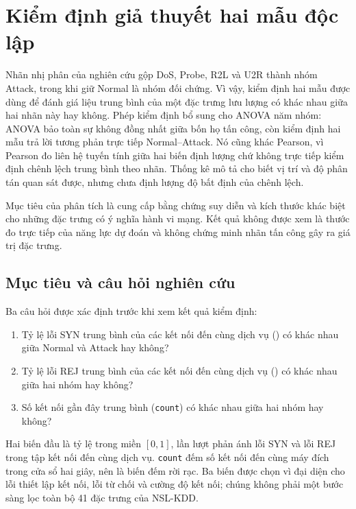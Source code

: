 \documentclass[../main.tex]{subfiles}
\begin{document}
\section{Kiểm định giả thuyết hai mẫu độc lập}
\label{sec:t35:method}

Nhãn nhị phân của nghiên cứu gộp DoS, Probe, R2L và U2R thành nhóm Attack, trong
khi giữ Normal là nhóm đối chứng. Vì vậy, kiểm định hai mẫu được dùng để đánh giá
liệu trung bình của một đặc trưng lưu lượng có khác nhau giữa hai nhãn này hay không.
Phép kiểm định bổ sung cho ANOVA năm nhóm: ANOVA bảo toàn sự không đồng nhất giữa
bốn họ tấn công, còn kiểm định hai mẫu trả lời tương phản trực tiếp Normal--Attack.
Nó cũng khác Pearson, vì Pearson đo liên hệ tuyến tính giữa hai biến định lượng chứ
không trực tiếp kiểm định chênh lệch trung bình theo nhãn. Thống kê mô tả cho biết vị
trí và độ phân tán quan sát được, nhưng chưa định lượng độ bất định của chênh lệch.

Mục tiêu của phân tích là cung cấp bằng chứng suy diễn và kích thước khác biệt cho
những đặc trưng có ý nghĩa hành vi mạng. Kết quả không được xem là thước đo trực tiếp
của năng lực dự đoán và không chứng minh nhãn tấn công gây ra giá trị đặc trưng.

\subsection{Mục tiêu và câu hỏi nghiên cứu}
\label{sec:t35:rq}

Ba câu hỏi được xác định trước khi xem kết quả kiểm định:
\begin{enumerate}[label=\textbf{RQ\arabic*:},leftmargin=1.7cm]
  \item Tỷ lệ lỗi SYN trung bình của các kết nối đến cùng dịch vụ
  () có khác nhau giữa Normal và Attack hay không?
  \item Tỷ lệ lỗi REJ trung bình của các kết nối đến cùng dịch vụ
  () có khác nhau giữa hai nhóm hay không?
  \item Số kết nối gần đây trung bình (\texttt{count}) có khác nhau giữa hai nhóm
  hay không?
\end{enumerate}

Hai biến đầu là tỷ lệ trong miền $[0,1]$, lần lượt phản ánh lỗi SYN và lỗi REJ trong
tập kết nối đến cùng dịch vụ. \texttt{count} đếm số kết nối đến cùng máy đích trong
cửa sổ hai giây, nên là biến đếm rời rạc. Ba biến được chọn vì đại diện cho lỗi thiết
lập kết nối, lỗi từ chối và cường độ kết nối; chúng không phải một bước sàng lọc toàn
bộ 41 đặc trưng của NSL-KDD.
\end{document}
